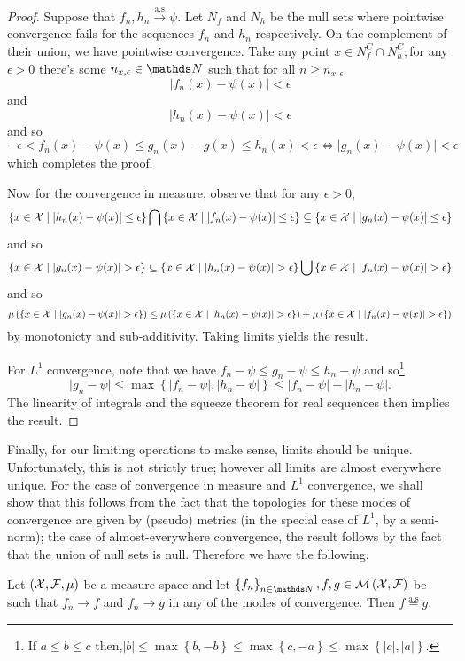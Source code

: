 \begin{proof}
Suppose that $f_{n},h_{n}\stackrel{\text{a.s}}{\longrightarrow}\psi$.
Let $N_{f}$ and $N_{h}$ be the null sets where pointwise convergence
fails for the sequences $f_{n}$ and $h_{n}$ respectively. On the
complement of their union, we have pointwise convergence. Take any
point $x\in N_{f}^{C}\cap N_{h}^{C};$for any $\epsilon>0$ there's
some $n_{x,\epsilon}\in\N$ such that for all $n\geq n_{x,\epsilon}$
\[
\lvert f_{n}(x)-\psi(x)\rvert<\epsilon
\]
and
\[
\lvert h_{n}(x)-\psi(x)\rvert<\epsilon
\]
and so
\[
-\epsilon<f_{n}(x)-\psi(x)\leq g_{n}(x)-g(x)\leq h_{n}(x)<\epsilon\Longleftrightarrow\lvert g_{n}(x)-\psi(x)\rvert<\epsilon
\]
which completes the proof.

Now for the convergence in measure, observe that for any $\epsilon>0$,
\[
\left\{ x\in\mathcal{X}\mid\lvert h_{n}(x)-\psi(x)\rvert\leq\epsilon\right\} \bigcap\left\{ x\in\mathcal{X}\mid\lvert f_{n}(x)-\psi(x)\rvert\leq\epsilon\right\} \subseteq\left\{ x\in\mathcal{X}\mid\lvert g_{n}(x)-\psi(x)\rvert\leq\epsilon\right\} 
\]
and so
\[
\left\{ x\in\mathcal{X}\mid\lvert g_{n}(x)-\psi(x)\rvert>\epsilon\right\} \subseteq\left\{ x\in\mathcal{X}\mid\lvert h_{n}(x)-\psi(x)\rvert>\epsilon\right\} \bigcup\left\{ x\in\mathcal{X}\mid\lvert f_{n}(x)-\psi(x)\rvert>\epsilon\right\} 
\]
and so
\[
\mu\left(\left\{ x\in\mathcal{X}\mid\lvert g_{n}(x)-\psi(x)\rvert>\epsilon\right\} \right)\leq\mu\left(\left\{ x\in\mathcal{X}\mid\lvert h_{n}(x)-\psi(x)\rvert>\epsilon\right\} \right)+\mu\left(\left\{ x\in\mathcal{X}\mid\lvert f_{n}(x)-\psi(x)\rvert>\epsilon\right\} \right)
\]
by monotonicty and sub-additivity. Taking limits yields the result.

For $L^{1}$ convergence, note that we have $f_{n}-\psi\leq g_{n}-\psi\leq h_{n}-\psi$
and so\footnote{If $a\leq b\leq c$ then,$\lvert b\rvert\leq\max\left\{ b,-b\right\} \leq\max\left\{ c,-a\right\} \leq\max\left\{ \lvert c\rvert,\lvert a\rvert\right\} .$}
\[
\lvert g_{n}-\psi\rvert\leq\max\left\{ \lvert f_{n}-\psi\rvert,\lvert h_{n}-\psi\rvert\right\} \leq\lvert f_{n}-\psi\rvert+\lvert h_{n}-\psi\rvert.
\]
The linearity of integrals and the squeeze theorem for real sequences
then implies the result.
\end{proof}
Finally, for our limiting operations to make sense, limits should
be unique. Unfortunately, this is not strictly true; however all limits
are almost everywhere unique. For the case of convergence in measure
and $L^{1}$ convergence, we shall show that this follows from the
fact that the topologies for these modes of convergence are given
by (pseudo) metrics (in the special case of $L^{1}$, by a semi-norm);
the case of almost-everywhere convergence, the result follows by the
fact that the union of null sets is null. Therefore we have the following.
\begin{prop}
\label{prop:limitUnique}Let $\left(\mathcal{X},\mathcal{F},\mu\right)$ be a measure
space and let $\left\{ f_{n}\right\} _{n\in\N},f,g\in\measurableFunctions$
be such that $f_{n}\longrightarrow f$ and $f_{n}\longrightarrow g$
in any of the modes of convergence. Then $f\stackrel{\text{a.s}}{=}g.$
\end{prop}

